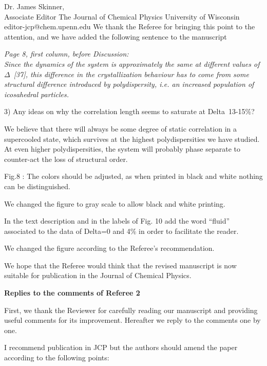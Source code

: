 \documentclass[a4paper, rebuttal, parskip=true, firsthead=false, fromemail=false, foldmarks=false]{scrlttr2}
\begin{document}
\begin{letter}{Dr. James Skinner,\\Associate Editor
The Journal of Chemical Physics
University of Wisconsin\\
editor-jcp@chem.upenn.edu }
We thank the Referee for bringing this point to the attention, and we have added the following sentence to the manuscript

{\it Page 8, first column, before Discussion:\\
Since the dynamics of the
system is approximately the same at different values of $\Delta$~[37], this difference in the crystallization behaviour has to come from
some structural difference introduced by polydispersity, i.e. an increased population of icosahedral particles.}


\begin{quotationi}
3) Any ideas on why the correlation length seems to saturate at Delta~13-15\%?
\end{quotationi}

We believe that there will always be some degree of static correlation in a supercooled state, which
survives at the highest polydispersities we have studied. At even higher polydispersities, the system
will probably phase separate to counter-act the loss of structural order.


\begin{quotationi}
Fig.8 : The colors should be adjusted, as when printed in black and white nothing can be distinguished.
\end{quotationi}
We changed the figure to gray scale to allow black and white printing.

\begin{quotationi}
In the text description and in the labels of Fig. 10 add the word ``fluid'' associated to the data of Delta=0 and 4\% in order to facilitate the reader.
\end{quotationi}
We changed the figure according to the Referee's recommendation.

We hope that the Referee would think that the revised manuscript is now suitable for publication in the Journal of Chemical Physics. 

\clearpage

\textsf{\textbf{Replies to the comments of Referee 2}}

First, we thank the Reviewer for carefully reading our manuscript and providing useful comments for its improvement. 
Hereafter we reply to the comments one by one.

\begin{quotationi}

I recommend publication in JCP but the authors should amend the paper
according to the following points:


\end{quotationi}
\end{letter}
\end{document}
